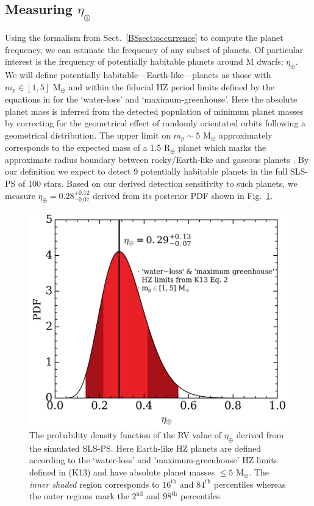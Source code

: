 \subsection{Measuring $\eta_{\oplus}$}
Using the formalism from Sect.~\ref{BSsect:occurrence} to compute the planet frequency,
we can estimate the frequency of any subset of planets. Of particular interest is the frequency 
of potentially habitable planets around M dwarfs; $\eta_{\oplus}$. We will define
potentially habitable---Earth-like---planets as those with $m_p \in [1,5]$
M$_{\oplus}$ and within the fiducial HZ period limits defined by the equations in
\cite{kopparapu13} for the `water-loss' and `maximum-greenhouse'. Here the absolute
planet mass is inferred from the detected population of minimum planet masses by
correcting for the geometrical effect of randomly orientated orbits following a
geometrical distribution.
The upper limit on $m_p \sim 5$ M$_{\oplus}$ approximately corresponds to the expected mass
of a 1.5 R$_{\oplus}$ planet which marks the approximate radius boundary
between rocky/Earth-like and gaseous planets \citep[e.g.][]{valencia13, lopez14, fulton17}.  
By our definition we expect to detect 9 potentially habitable planets
in the full SLS-PS of 100 stars. Based on our derived detection sensitivity to such planets,
we measure $\eta_{\oplus}=0.28^{+0.12}_{-0.07}$ derived from its posterior PDF shown in
Fig.~\ref{BSfig:etaEarth}. \\

\begin{figure}
  \centering
  \includegraphics[width=0.6\hsize]{figures/etaEarth.png}
  \caption[Expected measurement of $\eta_{\oplus}$ from the SLS-PS.]
      {\small The probability density function of the RV value of $\eta_{\oplus}$ derived from
    the simulated SLS-PS. Here Earth-like HZ planets are defined according to the `water-loss'
    and 'maximum-greenhouse' HZ limits defined in \citealt{kopparapu13} (K13) and have absolute planet
    masses $\leq 5$ M$_{\oplus}$. The \emph{inner shaded} region corresponds to $16^{\text{th}}$ and
    $84^{\text{th}}$ percentiles whereas the outer regions mark the $2^{\text{nd}}$ and
    $98^{\text{th}}$ percentiles.}
  \label{BSfig:etaEarth}
\end{figure}

